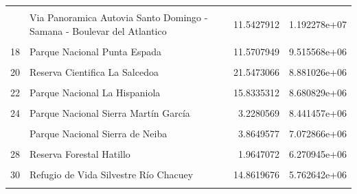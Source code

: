 \documentclass[10pt,landscape,a3paper]{article}
\begin{document}
\begin{longtable}[t]{llrr}
\cellcolor{lightgray}{15} & \cellcolor{lightgray}{Via Panoramica Entrada de Mao} & \cellcolor{lightgray}{22.6278261} & \cellcolor{lightgray}{1.230196e+07}\\
\addlinespace
16 & Via Panoramica Autovia Santo Domingo - Samana - Boulevar del Atlantico & 11.5427912 & 1.192278e+07\\
\cellcolor{lightgray}{17} & \cellcolor{lightgray}{Reserva Forestal Barrero} & \cellcolor{lightgray}{3.2605838} & \cellcolor{lightgray}{1.012874e+07}\\
18 & Parque Nacional Punta Espada & 11.5707949 & 9.515568e+06\\
\cellcolor{lightgray}{19} & \cellcolor{lightgray}{Reserva Biológica Loma Charco Azul} & \cellcolor{lightgray}{5.3589984} & \cellcolor{lightgray}{9.334805e+06}\\
20 & Reserva Cientifica La Salcedoa & 21.5473066 & 8.881026e+06\\
\addlinespace
\cellcolor{lightgray}{21} & \cellcolor{lightgray}{Parque Nacional Picky Lora} & \cellcolor{lightgray}{7.8947713} & \cellcolor{lightgray}{8.863962e+06}\\
22 & Parque Nacional La Hispaniola & 15.8335312 & 8.680829e+06\\
\cellcolor{lightgray}{23} & \cellcolor{lightgray}{Parque Nacional Cotubanamá (Del Este)} & \cellcolor{lightgray}{1.0818280} & \cellcolor{lightgray}{8.615735e+06}\\
24 & Parque Nacional Sierra Martín García & 3.2280569 & 8.441457e+06\\
\cellcolor{lightgray}{25} & \cellcolor{lightgray}{Monumento Natural Río Cumayasa y Cueva de las Maravillas} & \cellcolor{lightgray}{8.4629858} & \cellcolor{lightgray}{7.511724e+06}\\
\addlinespace
26 & Parque Nacional Sierra de Neiba & 3.8649577 & 7.072866e+06\\
\cellcolor{lightgray}{27} & \cellcolor{lightgray}{Parque Nacional Aniana Vargas} & \cellcolor{lightgray}{5.3429353} & \cellcolor{lightgray}{6.925885e+06}\\
28 & Reserva Forestal Hatillo & 1.9647072 & 6.270945e+06\\
\cellcolor{lightgray}{29} & \cellcolor{lightgray}{Parque Nacional Francisco Alberto Caamaño Deñó} & \cellcolor{lightgray}{1.0273068} & \cellcolor{lightgray}{6.035530e+06}\\
30 & Refugio de Vida Silvestre Río Chacuey & 14.8619676 & 5.762642e+06\\
\addlinespace
\cellcolor{lightgray}{31} & \cellcolor{lightgray}{Parque Nacional Luis Quin} & \cellcolor{lightgray}{2.8069861} & \cellcolor{lightgray}{5.538027e+06}\\

\end{longtable}
\end{document}
